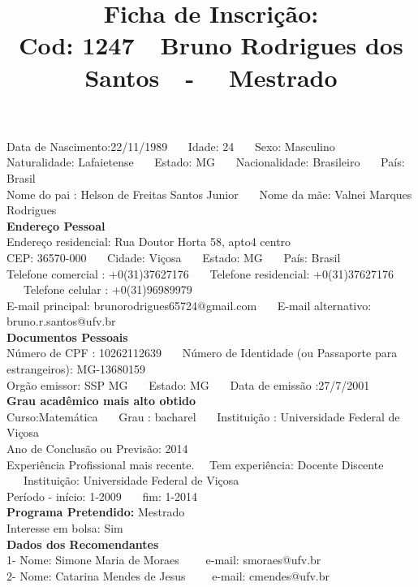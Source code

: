 \documentclass[11pt]{article}
\title{\vspace*{-4cm} Ficha de Inscrição: \\Cod: 1247\ \ Bruno Rodrigues dos Santos\ \ - \ \ Mestrado 
 }
\date{}
\begin{document}
\maketitle
\vspace*{-1.5cm}
\noindent Data de Nascimento:22/11/1989
\ \ \ Idade: 24   \ \ \ Sexo: Masculino
\\
Naturalidade: Lafaietense  
\ \ \  Estado: MG
\ \ \  Nacionalidade: Brasileiro
\ \ \ País: Brasil
\\        
Nome do pai : Helson de Freitas Santos Junior
\ \ \ Nome da mãe: Valnei Marques Rodrigues          
\\[0.2cm]                     
\textbf{Endereço Pessoal} 
\\ 
\noindent Endereço residencial: Rua Doutor Horta 58, apto4 centro 
\\
        CEP: 36570-000 
\ \ \ Cidade: Viçosa 
\ \ \ Estado: MG 
\ \ \ País: Brasil
\\		
		Telefone comercial : +0(31)37627176
\ \ \ Telefone residencial: +0(31)37627176
\ \ \ Telefone celular : +0(31)96989979
\\
E-mail principal: brunorodrigues65724@gmail.com
\ \ \ E-mail alternativo: bruno.r.santos@ufv.br 
\\[0.2cm] 
\textbf{Documentos Pessoais}
\\
\noindent Número de CPF : 10262112639
\ \ \ Número de Identidade (ou Passaporte para estrangeiros): MG-13680159
\\
Orgão emissor: SSP  MG
\ \ \ Estado: MG
\ \ \ Data de emissão :27/7/2001
\\[0.3cm]
\textbf{Grau acadêmico mais alto obtido}
\\	
Curso:Matemática
\ \ \ Grau : bacharel
\ \ \ Instituição : Universidade Federal de Viçosa
\\			
Ano de Conclusão ou Previsão: 2014
\\ 
Experiência Profissional mais recente. \ \  
Tem experiência: Docente Discente  
\ \ \ Instituição: Universidade Federal de Viçosa
\\  
Período - início: 1-2009
\ \ \ fim: 1-2014
\\[0.2cm] 
\textbf{Programa Pretendido:} Mestrado\\
Interesse em bolsa: Sim
\\[0.3cm]		
\textbf{Dados dos Recomendantes} 
\\
1- Nome: Simone Maria de Moraes
\ \ \ \  e-mail: smoraes@ufv.br 
\\
2- Nome: Catarina Mendes de Jesus
\ \ \ \ e-mail: cmendes@ufv.br
\end{document}
